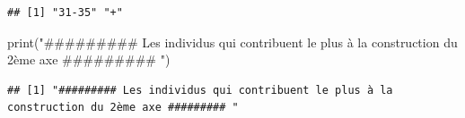 \documentclass[
]{article}
\newenvironment{Shaded}{\begin{snugshade}}{\end{snugshade}}
\newcommand{\AttributeTok}[1]{\textcolor[rgb]{0.77,0.63,0.00}{#1}}
\newcommand{\ControlFlowTok}[1]{\textcolor[rgb]{0.13,0.29,0.53}{\textbf{#1}}}
\newcommand{\DecValTok}[1]{\textcolor[rgb]{0.00,0.00,0.81}{#1}}
\newcommand{\FunctionTok}[1]{\textcolor[rgb]{0.00,0.00,0.00}{#1}}
\newcommand{\NormalTok}[1]{#1}
\newcommand{\OtherTok}[1]{\textcolor[rgb]{0.56,0.35,0.01}{#1}}
\newcommand{\SpecialCharTok}[1]{\textcolor[rgb]{0.00,0.00,0.00}{#1}}
\newcommand{\StringTok}[1]{\textcolor[rgb]{0.31,0.60,0.02}{#1}}
\begin{document}
\begin{Shaded}
\end{Shaded}

\begin{verbatim}
## [1] "31-35" "+"
\end{verbatim}

\begin{Shaded}
\begin{Highlighting}[]
\FunctionTok{print}\NormalTok{(}\StringTok{"\#\#\#\#\#\#\#\#\# Les individus qui contribuent le plus à la construction du 2ème axe \#\#\#\#\#\#\#\#\# "}\NormalTok{)}
\end{Highlighting}
\end{Shaded}

\begin{verbatim}
## [1] "######### Les individus qui contribuent le plus à la construction du 2ème axe ######### "
\end{verbatim}
\end{document}
